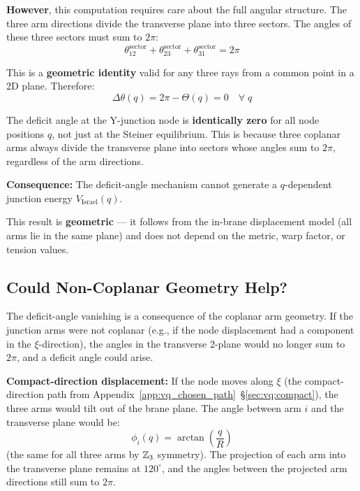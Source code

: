 \textbf{However}, this computation requires care about the full
angular structure. The three arm directions divide the transverse
plane into three sectors. The angles of these three sectors must sum
to $2\pi$:
\begin{equation}
    \theta_{12}^{\mathrm{sector}} + \theta_{23}^{\mathrm{sector}}
    + \theta_{31}^{\mathrm{sector}} = 2\pi
    \label{eq:angle_sum}
\end{equation}

This is a \textbf{geometric identity} valid for any three rays from
a common point in a 2D plane. Therefore:
\begin{equation}
    \boxed{\Delta\theta(q) = 2\pi - \Theta(q) = 0 \quad \forall\; q}
    \label{eq:deficit_zero}
\end{equation}

\begin{resultbox}[title=Key Result: Deficit Angle Vanishes Identically]
The deficit angle at the Y-junction node is \textbf{identically zero}
for all node positions $q$, not just at the Steiner equilibrium. This
is because three coplanar arms always divide the transverse plane into
sectors whose angles sum to $2\pi$, regardless of the arm directions.

\textbf{Consequence:} The deficit-angle mechanism cannot generate a
$q$-dependent junction energy $V_{\mathrm{Israel}}(q)$.

This result is \textbf{geometric} --- it follows from the
in-brane displacement model (all arms lie in the same plane) and does
not depend on the metric, warp factor, or tension values. \tagDc
\end{resultbox}

\subsection{Could Non-Coplanar Geometry Help?}

The deficit-angle vanishing is a consequence of the coplanar arm
geometry. If the junction arms were not coplanar (e.g., if the node
displacement had a component in the $\xi$-direction), the angles
in the transverse 2-plane would no longer sum to $2\pi$, and a
deficit angle could arise.

\textbf{Compact-direction displacement:} If the node moves along
$\xi$ (the compact-direction path from
Appendix~\ref{app:vq_chosen_path}~\S\ref{sec:vq:compact}), the three
arms would tilt out of the brane plane. The angle between arm $i$ and
the transverse plane would be:
\begin{equation}
    \phi_i(q) = \arctan\left(\frac{q}{R}\right)
    \label{eq:tilt_angle}
\end{equation}
(the same for all three arms by $\mathbb{Z}_3$ symmetry). The projection
of each arm into the transverse plane remains at $120^\circ$, and the
angles between the projected arm directions still sum to $2\pi$.

